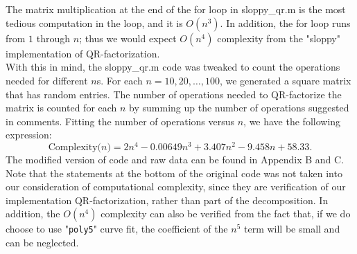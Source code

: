 \documentclass[11pt]{article}
\begin{document}
\section{}
The matrix multiplication at the end of the for loop in sloppy\_qr.m is the most tedious computation in the loop, and it is $O(n^3)$. In addition, the for loop runs from $1$ through $n$; thus we would expect $O(n^4)$ complexity from the "sloppy" implementation of QR-factorization.\\[0.5cm] 
With this in mind, the sloppy\_qr.m code was tweaked to count the operations needed for different $n$s. For each $n=10,20,\dots,100$, we generated a square matrix that has random entries. The number of operations needed to QR-factorize the matrix is counted for each $n$ by summing up the number of operations suggested in comments. Fitting the number of operations versus $n$, we have the following expression: 
$$\mathrm{Complexity(}n\mathrm{)}=2n^4-0.00649n^3+3.407n^2-9.458n+58.33.$$
The modified version of code and raw data can be found in Appendix B and C. Note that the statements at the bottom of the original code was not taken into our consideration of computational complexity, since they are verification of our implementation QR-factorization, rather than part of the decomposition. In addition, the $O(n^4)$ complexity can also be verified from the fact that, if we do choose to use "\texttt{poly5}" curve fit, the coefficient of the $n^5$ term will be small and can be neglected.

\newpage
\appendix{}
\end{document}
